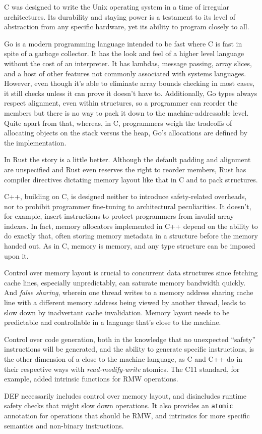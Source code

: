 C was designed to write the Unix operating system in a time of irregular architectures.  Its durability and staying power is a testament to its level of abstraction from any specific hardware, yet its ability to program closely to all.

Go is a modern programming language intended to be fast where C is fast in spite of a garbage collector.\cite{Go}  It has the look and feel of a higher level language without the cost of an interpreter.  It has lambdas, message passing, array slices, and a host of other features not commonly associated with systems languages.  However, even though it's able to eliminate array bounds checking in most cases, it still checks unless it can prove it doesn't have to.  Additionally, Go types always respect alignment, even within structures, so a programmer can reorder the members but there is no way to pack it down to the machine-addressable level.  Quite apart from that, whereas, in C, programmers weigh the tradeoffs of allocating objects on the stack versus the heap, Go's allocations are defined by the implementation.

In Rust the story is a little better. Although the default padding and alignment are unspecified and Rust even reserves the right to reorder members, Rust has compiler directives dictating memory layout like that in C and to pack structures.

C++, building on C, is designed neither to introduce safety-related overheads, nor to prohibit programmer fine-tuning to architectural peculiarities.  It doesn't, for example, insert instructions to protect programmers from invalid array indexes.  In fact, memory allocators implemented in C++ depend on the ability to do exactly that, often storing memory metadata in a structure before the memory handed out.\cite{Hoard, TCMalloc, Supermalloc}  As in C, memory is memory, and any type structure can be imposed upon it.

Control over memory layout is crucial to concurrent data structures since fetching cache lines, especially unpredictably, can saturate memory bandwidth quickly.  And \textit{false sharing}, wherein one thread writes to a memory address sharing cache line with a different memory address being viewed by another thread, leads to slow down by inadvertant cache invalidation.  Memory layout needs to be predictable and controllable in a language that's close to the machine.

Control over code generation, both in the knowledge that no unexpected ``safety'' instructions will be generated, and the ability to generate specific instructions, is the other dimension of a close to the machine language, as C and C++ do in their respective ways with \textit{read-modify-write} atomics.  The C11 standard, for example, added intrinsic functions for RMW operations.\cite{C11Atomics}

DEF necessarily includes control over memory layout, and disincludes runtime safety checks that might slow down operations.  It also provides an \texttt{atomic} annotation for operations that should be RMW, and intrinsics for more specific semantics and non-binary instructions.

